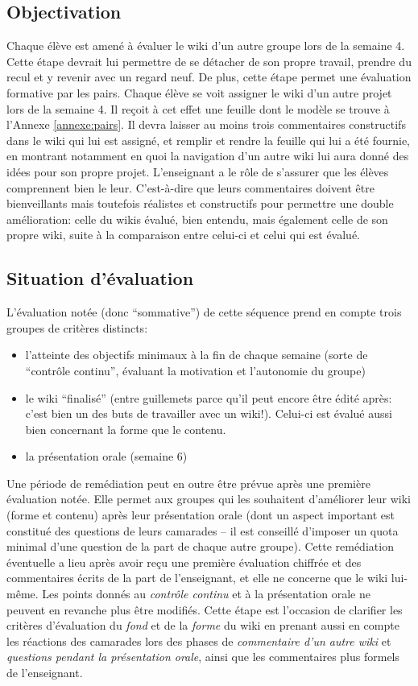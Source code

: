 \documentclass[11pt,bibliography=totoc]{scrartcl}
\newcommand\ajout[1]{{\color{blue} #1}}
\newcommand\rajout[1]{{\color{green} #1}}
\begin{document}
\subsection{Objectivation}
Chaque élève est amené à évaluer le wiki d'un autre groupe lors de la semaine
4. Cette étape devrait lui permettre de se détacher de son propre travail,
prendre du recul et y revenir avec un regard neuf. De plus, cette étape permet
une évaluation formative par les pairs. Chaque élève se voit assigner le wiki
d'un autre projet lors de la semaine 4. Il reçoit à cet effet une feuille dont
le modèle se trouve à l'Annexe \ref{annexe:pairs}. Il devra laisser au moins
trois commentaires constructifs dans le wiki qui lui est assigné, et remplir et
rendre la feuille qui lui a été fournie, en montrant notamment en quoi la
navigation d'un autre wiki lui aura donné des idées pour son propre projet.
\ajout {L'enseignant a le rôle de s'assurer que les élèves comprennent bien le
  leur. C'est-à-dire que leurs commentaires doivent être bienveillants mais
  toutefois réalistes et constructifs pour permettre une double amélioration:
  celle du wikis évalué, bien entendu, mais également celle de son propre wiki,
  suite à la comparaison entre celui-ci et celui qui est évalué.}

\subsection{Situation d'évaluation}
L'évaluation notée (donc ``sommative'') de cette séquence prend en compte trois
groupes de critères distincts:
\begin{itemize}
\item l'atteinte des objectifs minimaux à la fin de chaque semaine (sorte de
  ``contrôle continu'', évaluant la motivation et l'autonomie du groupe)
\item le wiki ``finalisé'' (entre guillemets parce qu'il peut encore être édité
  après: c'est bien un des buts de travailler avec un wiki!). \rajout{Celui-ci
    est évalué aussi bien concernant la forme que le contenu.}
\item la présentation orale (semaine 6)
\end{itemize}
\rajout{Une période de remédiation peut en outre être prévue après une première
  évaluation notée. Elle permet aux groupes qui les souhaitent d'améliorer leur
  wiki (forme et contenu) après leur présentation orale (dont un aspect
  important est constitué des questions de leurs camarades -- il est conseillé
  d'imposer un quota minimal d'une question de la part de chaque autre
  groupe). Cette remédiation éventuelle a lieu après avoir reçu une première
  évaluation chiffrée et des commentaires écrits de la part de l'enseignant, et
  elle ne concerne que le wiki lui-même. Les points donnés au \textit{contrôle
    continu} et à la présentation orale ne peuvent en revanche plus être
  modifiés. Cette étape est l'occasion de clarifier les critères d'évaluation du
  \textit{fond} et de la \textit{forme} du wiki en prenant aussi en compte les
  réactions des camarades lors des phases de \textit{commentaire d'un autre
    wiki} et \textit{questions pendant la présentation orale}, ainsi que les
  commentaires plus formels de l'enseignant.}
\end{document}
